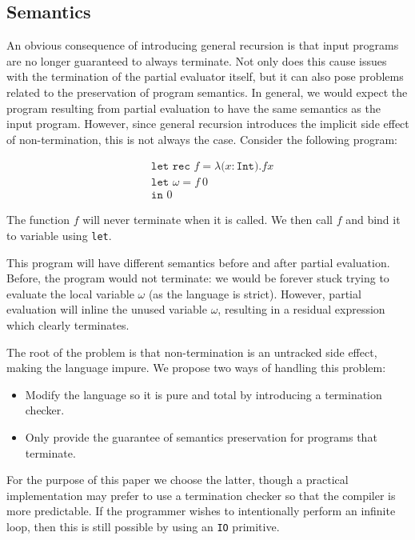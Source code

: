 \documentclass[runningheads]{llncs}
\begin{document}
\subsection{Semantics}

An obvious consequence of introducing general recursion is that input programs are no longer guaranteed to always terminate. Not only does this cause issues with the termination of the partial evaluator itself, but it can also pose problems related to the preservation of program semantics. In general, we would expect the program resulting from partial evaluation to have the same semantics as the input program. However, since general recursion introduces the implicit side effect of non-termination, this is not always the case. Consider the following program:

\[
  \begin{split}
    &\texttt{let rec $f = \lambda (x : $Int$). f x$} \\
    &\texttt{let $\omega = f\ 0$} \\
    &\texttt{in } 0
  \end{split}
\]

The function $f$ will never terminate when it is called. We then call $f$ and bind it to variable using \texttt{let}.

This program will have different semantics before and after partial evaluation. Before, the program would not terminate: we would be forever stuck trying to evaluate the local variable $\omega$ (as the language is strict). However, partial evaluation will inline the unused variable $\omega$, resulting in a residual expression which clearly terminates.

The root of the problem is that non-termination is an untracked side effect, making the language impure. We propose two ways of handling this problem:

\begin{itemize}
  \item Modify the language so it is pure and total by introducing a termination checker.
  \item Only provide the guarantee of semantics preservation for programs that terminate.
\end{itemize}

For the purpose of this paper we choose the latter, though a practical implementation may prefer to use a termination checker so that the compiler is more predictable. If the programmer wishes to intentionally perform an infinite loop, then this is still possible by using an \texttt{IO} primitive.
\end{document}
